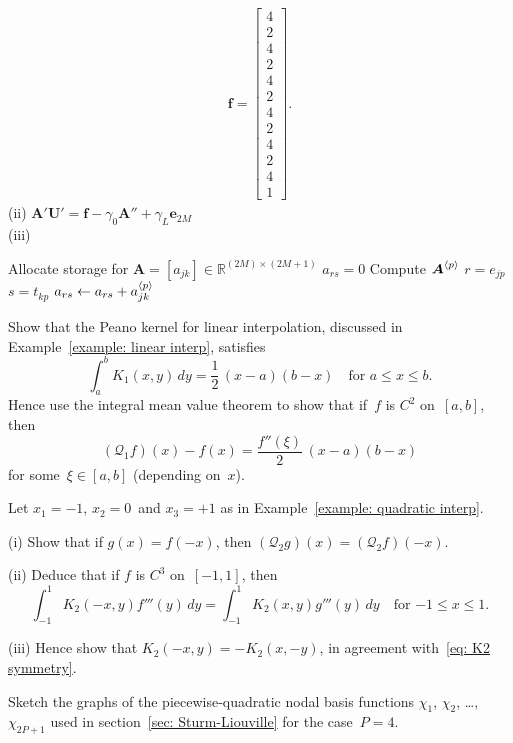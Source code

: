 \begin{Exercises}
\begin{ans}
\begin{gather*}
\boldsymbol{f}=\left[\begin{array}{c}
4\\ 2\\ 4\\ 2\\ 4\\ 2\\ 4\\ 2\\ 4\\ 2\\ 4\\ 1
\end{array}\right].
\end{gather*}
(ii) $\boldsymbol{A}'\boldsymbol{U}'=\boldsymbol{f}-\gamma_0\boldsymbol{A}''
+\gamma_L\boldsymbol{e}_{2M}$\\
(iii)
\begin{algorithmic}
\State Allocate storage for 
$\boldsymbol{A}=[a_{jk}]\in\mathbb{R}^{(2M)\times(2M+1)}$ 
        \State $a_{rs}=0$ 
    \EndFor
\EndFor
{}
    \State Compute $\boldsymbol{A}^{\langle p\rangle}$ 
        \State $r=e_{jp}$
                \State $s=t_{kp}$
                \State $a_{rs}\gets a_{rs}+a^{\langle p\rangle}_{jk}$
            \EndFor
        \EndIf
    \EndFor
\EndFor
\end{algorithmic}
\end{ans}

\exercise
Show that the Peano kernel for linear interpolation, discussed in 
Example~\ref{example: linear interp}, satisfies
\[
\int_a^b K_1(x,y)\,dy=\frac{1}{2}\,(x-a)(b-x)\quad\text{for $a\le x\le b$.}
\]
Hence use the integral mean value theorem to show that if~$f$ is $C^2$ 
on~$[a,b]$, then 
\[
(\mathcal{Q}_1f)(x)-f(x)=\frac{f''(\xi)}{2}\,(x-a)(b-x)
\]
for some~$\xi\in[a,b]$ (depending on~$x$).

\exercise
Let $x_1=-1$, $x_2=0$~and $x_3=+1$ as in 
Example~\ref{example: quadratic interp}.  
\begin{description}
\item{(i)} Show that if $g(x)=f(-x)$, then 
$(\mathcal{Q}_2g)(x)=(\mathcal{Q}_2f)(-x)$.
\item{(ii)} Deduce that if $f$ is $C^3$ on~$[-1,1]$, then
\[
\int_{-1}^1K_2(-x,y)f'''(y)\,dy=\int_{-1}^1K_2(x,y)g'''(y)\,dy
	\quad\text{for $-1\le x\le 1$.}
\]
\item{(iii)} Hence show that $K_2(-x,y)=-K_2(x,-y)$, in agreement 
with~\eqref{eq: K2 symmetry}.
\end{description}

\exercise
Sketch the graphs of the piecewise-quadratic nodal basis functions $\chi_1$, 
$\chi_2$, \dots, $\chi_{2P+1}$ used in section~\ref{sec: Sturm-Liouville}
for the case~$P=4$.

\end{Exercises}
